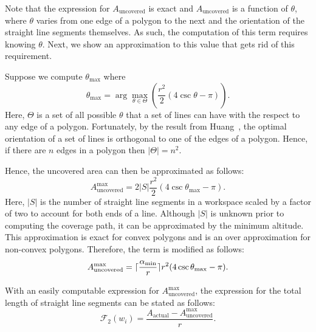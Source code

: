 \documentclass[../main.tex]{subfiles}
\begin{document}
Note that the expression for $A_{\text{uncovered}}$ is exact and $A_{\text{uncovered}}$ is a function of $\theta$, where $\theta$ varies from one edge of a polygon to the next and the orientation of the straight line segments themselves. As such, the computation of this term requires knowing $\theta$. Next, we show an approximation to this value that gets rid of this requirement.

Suppose we compute $\theta_{\max}$ where
\begin{equation}
	\theta_{\max}=\arg\max_{\theta\in\Theta}\left(\frac{r^2}{2}(4\csc\theta-\pi)\right).
\end{equation}%
Here, $\Theta$ is a set of all possible $\theta$ that a set of lines can have with the respect to any edge of a polygon. Fortunately, by the result from Huang~\cite{Huang2001optimal}, the optimal orientation of a set of lines is orthogonal to one of the edges of a polygon. Hence, if there are $n$ edges in a polygon then $|\Theta|=n^2$.

Hence, the uncovered area can then be approximated as follows:
\begin{equation}
	A_{\text{uncovered}}^{\max}=2|S|\frac{r^2}{2}(4\csc\theta_{\max}-\pi).
\end{equation}%
Here, $|S|$ is the number of straight line segments in a workspace scaled by a factor of two to account for both ends of a line. Although $|S|$ is unknown prior to computing the coverage path, it can be approximated by the minimum altitude. This approximation is exact for convex polygons and is an over approximation for non-convex polygons. Therefore, the term is modified as follows:
\begin{equation}
	A_{\text{uncovered}}^{\max}=\lceil\frac{\alpha_{\min}}{r}\rceil r^2(4\csc\theta_{\max}-\pi).
\end{equation}

With an easily computable expression for $A_{\text{uncovered}}^{\max}$, the expression for the total length of straight line segments can be stated as follows:
\begin{equation}
	\mathcal{F}_2(w_i)=\frac{A_{\text{actual}}-A_{\text{uncovered}}^{\max}}{r}.
\end{equation}
\end{document}
